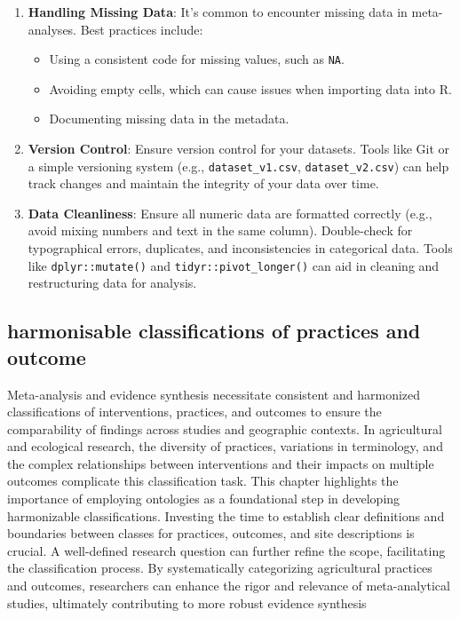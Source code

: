 \documentclass[
]{book}
\providecommand{\tightlist}{%
  \setlength{\itemsep}{0pt}\setlength{\parskip}{0pt}}
\begin{document}
\begin{enumerate}
\def\labelenumi{\arabic{enumi}.}
\setcounter{enumi}{3}
\item
  \textbf{Handling Missing Data}: It's common to encounter missing data in meta-analyses.
  Best practices include:

  \begin{itemize}
  \tightlist
  \item
    Using a consistent code for missing values, such as \texttt{NA}.
  \item
    Avoiding empty cells, which can cause issues when importing data into R.
  \item
    Documenting missing data in the metadata.
  \end{itemize}
\item
  \textbf{Version Control}: Ensure version control for your datasets.
  Tools like Git or a simple versioning system (e.g., \texttt{dataset\_v1.csv}, \texttt{dataset\_v2.csv}) can help track changes and maintain the integrity of your data over time.
\item
  \textbf{Data Cleanliness}: Ensure all numeric data are formatted correctly (e.g., avoid mixing numbers and text in the same column).
  Double-check for typographical errors, duplicates, and inconsistencies in categorical data.
  Tools like \texttt{dplyr::mutate()} and \texttt{tidyr::pivot\_longer()} can aid in cleaning and restructuring data for analysis.
\end{enumerate}

\subsection{harmonisable classifications of practices and outcome}\label{harmonisable-classifications-of-practices-and-outcome}

Meta-analysis and evidence synthesis necessitate consistent and harmonized classifications of interventions, practices, and outcomes to ensure the comparability of findings across studies and geographic contexts.
In agricultural and ecological research, the diversity of practices, variations in terminology, and the complex relationships between interventions and their impacts on multiple outcomes complicate this classification task.
This chapter highlights the importance of employing ontologies as a foundational step in developing harmonizable classifications.
Investing the time to establish clear definitions and boundaries between classes for practices, outcomes, and site descriptions is crucial.
A well-defined research question can further refine the scope, facilitating the classification process.
By systematically categorizing agricultural practices and outcomes, researchers can enhance the rigor and relevance of meta-analytical studies, ultimately contributing to more robust evidence synthesis
\end{document}
